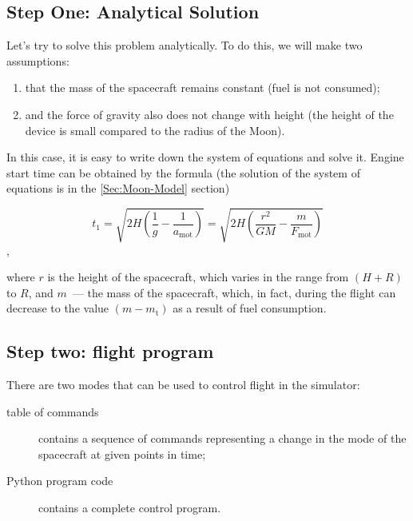 \documentclass[12pt,a4paper]{article}
\begin{document}
\subsection{Step One: Analytical Solution}

Let's try to solve this problem analytically. To do this, we will make two assumptions:

\begin{enumerate}
\item that the mass of the spacecraft remains constant (fuel is not consumed);
\item and the force of gravity also does not change with height (the height of the device is small compared to the radius of the Moon).
\end{enumerate}

In this case, it is easy to write down the system of equations and solve it. Engine start time
can be obtained by the formula (the solution of the system of equations is in the \ref{Sec:Moon-Model} section)

$$ t_1 = \sqrt{2 H \left(\frac{1}{g} - \frac{1}{a_{\text{mot}}}\right)} =
\sqrt{2 H \left(\frac{r^2}{G M} - \frac{m}{F_{\text{mot}}}\right)} $$,

where $r$ is the height of the spacecraft, which varies in the range from $(H + R)$ to $R$, and $m$~--- the mass of the spacecraft, which, in fact, during the flight can decrease to the value $(m - m_{\text{t}})$ as a result of fuel consumption.

\hfill

\noindent{}

\subsection{Step two: flight program}

There are two modes that can be used to control flight in the simulator:

\begin{description}
\item[table of commands] contains a sequence of commands representing a change in the mode of the spacecraft at given points in time;
\item[Python program code] contains a complete control program.
\end{description}
\end{document}

